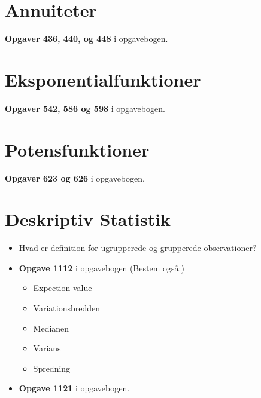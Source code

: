 \documentclass[10pt,a4paper]{article}
\begin{document}
\section{Annuiteter}
\textbf{Opgaver 436, 440, og 448} i opgavebogen.

\section{Eksponentialfunktioner}
\textbf{Opgaver 542, 586 og 598} i opgavebogen.

\section{Potensfunktioner}
\textbf{Opgaver 623 og 626} i opgavebogen.

\section{Deskriptiv Statistik}
\begin{itemize}
\item Hvad er definition for ugrupperede og grupperede observationer?
\item \textbf{Opgave 1112} i opgavebogen (Bestem også:)
\begin{itemize}
	\item Expection value
	\item Variationsbredden
	\item Medianen
	\item Varians
	\item Spredning
\end{itemize}
\item \textbf{Opgave 1121} i opgavebogen. 	
\end{itemize}
\end{document}
